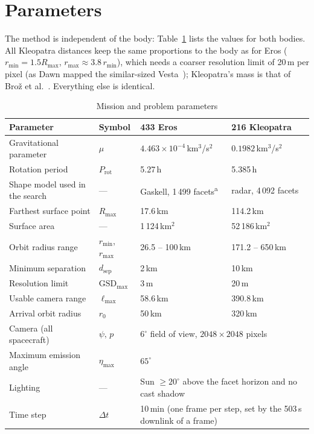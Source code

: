 \section{Parameters}
The method is independent of the body: Table~\ref{tab:params} lists the values for both bodies.
All Kleopatra distances keep the same proportions to the body as for Eros
($r_{\min}=1.5R_{\max}$, $r_{\max}\approx3.8\,r_{\min}$), which needs a coarser resolution limit
of 20\,m per pixel (as Dawn mapped the similar-sized Vesta~\cite{raymond2011}); Kleopatra's mass is
that of Bro\v{z} et al.~\cite{broz2021}. Everything else is identical.

\begin{table}[htbp]
\centering
\caption{Mission and problem parameters}
\label{tab:params}
\footnotesize
\begin{tabularx}{\textwidth}{@{}Xp{1.6cm}p{3.3cm}p{3.3cm}@{}}
\toprule
Parameter & Symbol & 433 Eros & 216 Kleopatra \\
\midrule
Gravitational parameter & $\mu$ & $4.463\times10^{-4}$\,km$^3$/s$^2$ & $0.1982$\,km$^3$/s$^2$ \\
Rotation period & $P_{\mathrm{rot}}$ & 5.27\,h & 5.385\,h \\
Shape model used in the search & --- & Gaskell, 1\,499 facets\textsuperscript{a} & radar, 4\,092 facets \\
Farthest surface point & $R_{\max}$ & 17.6\,km & 114.2\,km \\
Surface area & --- & 1\,124\,km$^2$ & 52\,186\,km$^2$ \\
Orbit radius range & $r_{\min}$, $r_{\max}$ & 26.5 -- 100\,km & 171.2 -- 650\,km \\
Minimum separation & $d_{\mathrm{sep}}$ & 2\,km & 10\,km \\
Resolution limit & $\mathrm{GSD}_{\max}$ & 3\,m & 20\,m \\
Usable camera range & $\ell_{\max}$ & 58.6\,km & 390.8\,km \\
Arrival orbit radius & $r_0$ & 50\,km & 320\,km \\
\midrule
Camera (all spacecraft) & $\psi,\,p$ & \multicolumn{2}{p{6.6cm}}{$6^\circ$ field of view, $2048\times2048$ pixels} \\
Maximum emission angle & $\eta_{\max}$ & \multicolumn{2}{p{6.6cm}}{$65^\circ$} \\
Lighting & --- & \multicolumn{2}{p{6.6cm}}{Sun $\ge20^\circ$ above the facet horizon and no cast shadow} \\
Time step & $\Delta t$ & \multicolumn{2}{p{6.6cm}}{10\,min (one frame per step, set by the 503\,s downlink of a frame)} \\

\end{tabularx}
\end{table}
